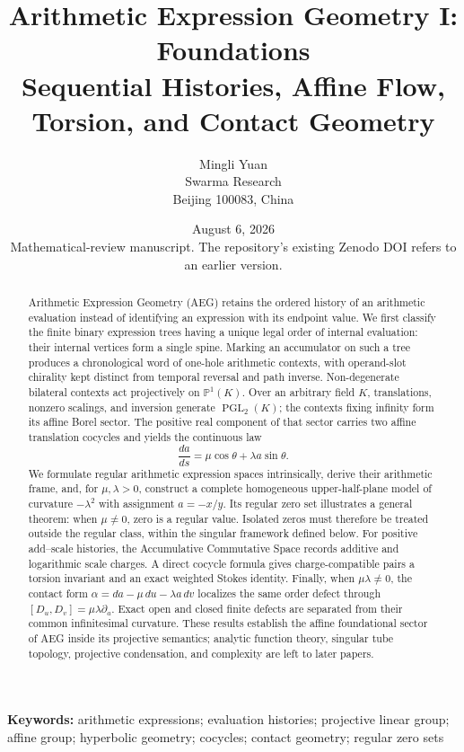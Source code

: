 \documentclass[11pt]{article}
\title{\textbf{Arithmetic Expression Geometry I: Foundations}\\[0.45em]
\large Sequential Histories, Affine Flow, Torsion, and Contact Geometry}
\author{
Mingli Yuan\\
Swarma Research\\
Beijing 100083, China
}
\date{August 6, 2026\\[0.25em]
\small Mathematical-review manuscript. The repository's existing Zenodo DOI refers to an earlier version.}
\theoremstyle{definition}
\theoremstyle{remark}
\newcommand{\PP}{\mathbb{P}}
\newcommand{\PGL}{\operatorname{PGL}}
\begin{document}
\maketitle

\begin{abstract}
Arithmetic Expression Geometry (AEG) retains the ordered history of an arithmetic
evaluation instead of identifying an expression with its endpoint value.  We first
classify the finite binary expression trees having a unique legal order of internal
evaluation: their internal vertices form a single spine.  Marking an accumulator on
such a tree produces a chronological word of one-hole arithmetic contexts, with
operand-slot chirality kept distinct from temporal reversal and path inverse.
Non-degenerate bilateral contexts act projectively on $\PP^1(K)$.  Over an arbitrary
field $K$, translations, nonzero scalings, and inversion generate $\PGL_2(K)$; the
contexts fixing infinity form its affine Borel sector.  The positive real component
of that sector carries two affine translation cocycles and yields the continuous law
\[
  \frac{da}{ds}=\mu\cos\theta+\lambda a\sin\theta.
\]
We formulate regular arithmetic expression spaces intrinsically, derive their
arithmetic frame, and, for $\mu,\lambda>0$, construct a complete homogeneous upper-half-plane model of
curvature $-\lambda^2$ with assignment $a=-x/y$.  Its regular zero set illustrates a
general theorem: when $\mu\ne0$, zero is a regular value.  Isolated zeros must
therefore be treated outside the regular class, within the singular framework defined
below.  For positive add--scale histories,
the Accumulative Commutative Space records additive and logarithmic scale charges.
A direct cocycle formula gives charge-compatible pairs a torsion invariant and an
exact weighted Stokes identity.  Finally, when $\mu\lambda\ne0$, the contact form
$\alpha=da-\mu\,du-\lambda a\,dv$ localizes the same order defect through
$[D_u,D_v]=\mu\lambda\partial_a$.  Exact open and closed finite defects are separated
from their common infinitesimal curvature.  These results establish the affine
foundational sector of AEG inside its projective semantics; analytic function theory,
singular tube topology, projective condensation, and complexity are left to later
papers.
\end{abstract}

\noindent\textbf{Keywords:}
arithmetic expressions; evaluation histories; projective linear group; affine group;
hyperbolic geometry; cocycles; contact geometry; regular zero sets
\end{document}
